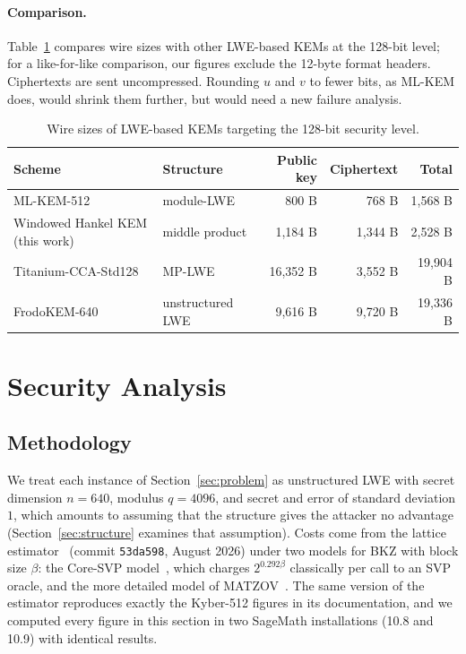 \documentclass[11pt,a4paper]{article}
\theoremstyle{definition}
\begin{document}
\paragraph{Comparison.} Table~\ref{tab:comparison} compares wire sizes with other LWE-based KEMs at the 128-bit level; for a like-for-like comparison, our figures exclude the 12-byte format headers. Ciphertexts are sent uncompressed. Rounding $u$ and $v$ to fewer bits, as ML-KEM does, would shrink them further, but would need a new failure analysis.

\begin{table}[H]
\centering
\small
\begin{tabular}{llrrr}
\toprule
Scheme & Structure & Public key & Ciphertext & Total \\
\midrule
ML-KEM-512~\cite{fips203} & module-LWE & 800 B & 768 B & 1{,}568 B \\
Windowed Hankel KEM (this work) & middle product & 1{,}184 B & 1{,}344 B & 2{,}528 B \\
Titanium-CCA-Std128~\cite{titanium2017nist} & MP-LWE & 16{,}352 B & 3{,}552 B & 19{,}904 B \\
FrodoKEM-640~\cite{bos2016frodo} & unstructured LWE & 9{,}616 B & 9{,}720 B & 19{,}336 B \\
\bottomrule
\end{tabular}
\caption{Wire sizes of LWE-based KEMs targeting the 128-bit security level.}
\label{tab:comparison}
\end{table}

\section{Security Analysis}\label{sec:security}

\subsection{Methodology}
We treat each instance of Section~\ref{sec:problem} as unstructured LWE with secret dimension $n = 640$, modulus $q = 4096$, and secret and error of standard deviation $1$, which amounts to assuming that the structure gives the attacker no advantage (Section~\ref{sec:structure} examines that assumption). Costs come from the lattice estimator~\cite{latticeestimator} (commit \texttt{53da598}, August 2026) under two models for BKZ with block size $\beta$: the Core-SVP model~\cite{adps2016newhope}, which charges $2^{0.292\beta}$ classically per call to an SVP oracle, and the more detailed model of MATZOV~\cite{matzov2022}. The same version of the estimator reproduces exactly the Kyber-512 figures in its documentation, and we computed every figure in this section in two SageMath installations (10.8 and 10.9) with identical results.
\end{document}
